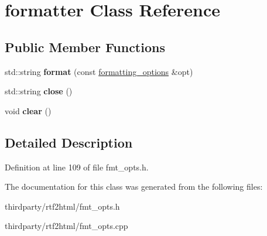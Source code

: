 \hypertarget{classformatter}{}\section{formatter Class Reference}
\label{classformatter}
\subsection*{Public Member Functions}
\begin{DoxyCompactItemize}
\item 
\mbox{\label{classformatter_a1ca879ccecf7e7915aab9949baf74fe3}} 
std\+::string {\bfseries format} (const \hyperlink{structformatting__options}{formatting\+\_\+options} \&opt)
\item 
\mbox{\label{classformatter_a7b99dbd5bfed74183b1a2e91759055a1}} 
std\+::string {\bfseries close} ()
\item 
\mbox{\label{classformatter_acf1101b0a52a5cd7c00a9a9cfa8e288e}} 
void {\bfseries clear} ()
\end{DoxyCompactItemize}


\subsection{Detailed Description}


Definition at line 109 of file fmt\+\_\+opts.\+h.



The documentation for this class was generated from the following files\+:\begin{DoxyCompactItemize}
\item 
thirdparty/rtf2html/fmt\+\_\+opts.\+h\item 
thirdparty/rtf2html/fmt\+\_\+opts.\+cpp\end{DoxyCompactItemize}
